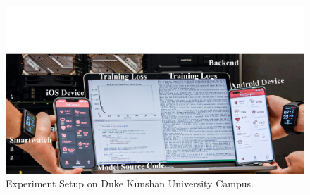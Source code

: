 \documentclass[conference]{IEEEtran}
\begin{document}
\begin{figure}
    \centering
    \includegraphics*[width=0.9\linewidth]{fedcampus.pdf}
       \vspace{-1mm}
    \caption{\FedCampus{} Experiment Setup on Duke Kunshan University Campus.}
    \label{fig:fedcampus}
        \vspace{-1mm}
\end{figure}



\end{document}
